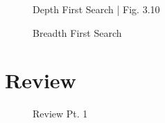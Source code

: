 \documentclass[12pt,a4paper]{article}
\begin{document}
    \begin{figure}[!hbtp]
        \centering
        \caption{Depth First Search | Fig. 3.10}
    \end{figure}


    \begin{figure}[!hbtp]
        \centering
        \caption{Breadth First Search}
    \end{figure}

\newpage
\section{Review}
    
    \begin{figure}[!hbtp]
        \centering
        \caption{Review Pt. 1}
    \end{figure}
\end{document}
